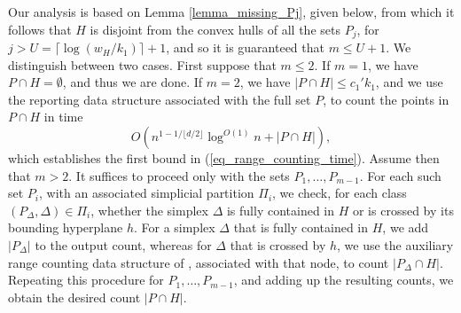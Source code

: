 \documentclass[11pt]{article}
\begin{document}
Our analysis is based on Lemma \ref{lemma_missing_Pj}, given below, from which it follows that $H$ is disjoint from the convex hulls of all the sets $P_{j}$, for $j > U = \lceil \log (w_{H}/k_{1}) \rceil + 1$, and so it is guaranteed that $m \leq U + 1$. We distinguish between two cases. First suppose that $m \leq 2$. If $m = 1$, we have $P \cap H = \emptyset$, and thus we are done. If $m = 2$, we have $|P \cap H| \leq c_{1}' k_{1}$, and we use the reporting data structure associated with the full set $P$, to count the points in $P \cap H$ in time
$$
O\left(n^{1-1/ \lfloor d/2 \rfloor} \log^{O(1)}n + |P \cap H|\right),
$$
which establishes the first bound in (\ref{eq_range_counting_time}). Assume then that $m > 2$. It suffices to proceed only with the sets $P_{1}, \ldots, P_{m-1}$. For each such set $P_{i}$, with an associated simplicial partition $\Pi_{i}$, we check, for each class $(P_{\Delta}, \Delta) \in \Pi_{i}$, whether the simplex $\Delta$ is fully contained in $H$ or is crossed by its bounding hyperplane $h$. For a simplex $\Delta$ that is fully contained in $H$, we add $|P_{\Delta}|$ to the output count, whereas for $\Delta$ that is crossed by $h$, we use the auxiliary range counting data structure of \cite{mat92a}, associated with that node, to count $|P_{\Delta} \cap H|$. Repeating this procedure for $P_{1}, \ldots, P_{m-1}$, and adding up the resulting counts, we obtain the desired count $|P \cap H|$.
\end{document}
